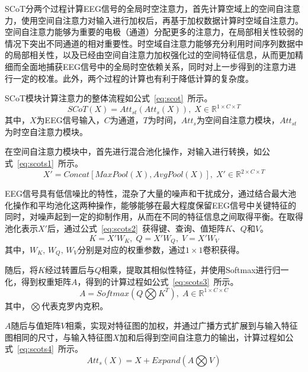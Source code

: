 SCoT分两个过程计算EEG信号的全局时空注意力，首先计算空域上的空间自注意力，使用空间自注意力对输入进行加权后，再基于加权数据计算时空域自注意力。空间自注意力能够为重要的电极（通道）分配更多的注意力，在局部相关性较弱的情况下突出不同通道的相对重要性。时空域自注意力能够充分利用时间序列数据中的局部相关性，以及已经由空间自注意力加权强化过的空间特征信息，从而更加精细而全面地捕获EEG信号中的全局时空依赖关系，同时对上一步得到的注意力进行一定的校准。此外，两个过程的计算也有利于降低计算的复杂度。

SCoT模块计算注意力的整体流程如公式~\ref{eq:scot}~所示。
\begin{equation}
    SCoT(X)=Att_{st}(Att_s(X)), \; X \in \mathbb{R}^{1 \times C \times T}
    \label{eq:scot}
\end{equation}
其中，\(X\)为EEG信号输入，\(C\)为通道，\(T\)为时间，\(Att_s\)为空间自注意力模块，\(Att_{st}\)为时空自注意力模块。

在空间自注意力模块中，首先进行混合池化操作，对输入进行转换，如公式~\ref{eq:scots1}~所示。
\begin{equation}
    X'=Concat[MaxPool(X),AvgPool(X)],\;X' \in \mathbb{R}^{2 \times C \times T}
    \label{eq:scots1}
\end{equation}

EEG信号具有低信噪比的特性，混杂了大量的噪声和干扰成分，通过结合最大池化操作和平均池化这两种操作，能够能够在最大程度保留EEG信号中关键特征的同时，对噪声起到一定的抑制作用，从而在不同的特征信息之间取得平衡。在取得池化表示\(X'\)后，通过公式~\ref{eq:scots2}~获得键、查询、值矩阵\(K\)、\(Q\)和\(V\)。
\begin{equation}\label{eq:scots2}
    K=X'W_K,\;Q=X'W_Q,\;V=X'W_V
\end{equation}
其中，\(W_K,\,W_Q,\,W_V\)分别是对应的权重参数，通过\(1\times1\)卷积获得。

随后，将\(K\)经过转置后与\(Q\)相乘，提取其相似性特征，并使用Softmax进行归一化，得到权重矩阵\(A\)，得到的计算过程如公式~\ref{eq:scots3}~所示。
\begin{equation}\label{eq:scots3}
    A=Softmax(Q \bigotimes K^T),\;A \in \mathbb{R}^{1 \times C \times C}
\end{equation}
其中，\(\bigotimes\)代表克罗内克积。

\(A\)随后与值矩阵\(V\)相乘，实现对特征图的加权，并通过广播方式扩展到与输入特征图相同的尺寸，与输入特征图\(X\)加和后得到空间自注意力的输出，计算过程如公式~\ref{eq:scots4}~所示。
\begin{equation}\label{eq:scots4}
    Att_s(X)=X+Expand(A \bigotimes V)
\end{equation}

